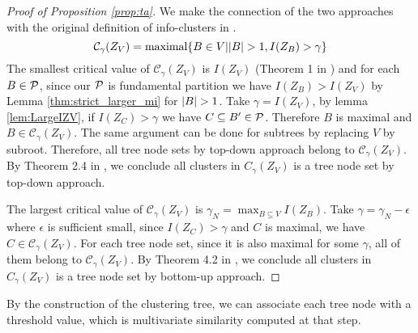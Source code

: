 \documentclass{article}
\begin{document}
\begin{proof}[Proof of Proposition \ref{prop:ta}]
We make the connection of the two approaches with the original definition of info-clusters in \cite{RN1}.
\begin{equation}\label{eq:def_CgammaZV}
\mathcal{C}_{\gamma}(Z_V) = \textrm{maximal}\{ B \in V \vert \abs{B} > 1, I(Z_B) > \gamma \}
\end{equation}
The smallest critical value of $\mathcal{C}_{\gamma}(Z_V)$ is $I(Z_V)$ (Theorem 1 in \cite{RN1}) and for each $B \in \P$, since  our $\P$ is fundamental partition we have $I(Z_B) > I(Z_V)$ by Lemma \ref{thm:strict_larger_mi} for $\abs{B}>1$. Take $\gamma = I(Z_V)$, by lemma \ref{lem:LargeIZV}, if $I(Z_C) > \gamma$ we have $C\subseteq B' \in \P$. Therefore $B$ is maximal and $B\in \mathcal{C}_{\gamma}(Z_V)$. The same argument can be done for subtrees by replacing $V$ by subroot. Therefore, all tree node sets by top-down approach belong to $\mathcal{C}_{\gamma}(Z_V)$. By Theorem 2.4 in \cite{RN1}, we conclude all clusters in $C_{\gamma}(Z_V)$ is a tree node set by top-down approach.

The largest critical value of $\mathcal{C}_{\gamma}(Z_V)$ is $\gamma_N = \max_{B\subseteq V} I(Z_B)$. Take $\gamma = \gamma_N - \epsilon$ where $\epsilon$ is sufficient small, since $I(Z_C) > \gamma$ and $C$ is maximal, we have $C \in \mathcal{C}_{\gamma}(Z_V)$. For each tree node set, since it is also maximal for some $\gamma$, all of them belong to $\mathcal{C}_{\gamma}(Z_V)$. By Theorem 4.2 in \cite{RN8}, we conclude all clusters in $C_{\gamma}(Z_V)$ is a tree node set by bottom-up approach.
\end{proof}
By the construction of the clustering tree, we can associate each tree node with a threshold value, which is multivariate similarity computed at that step.
\end{document}
